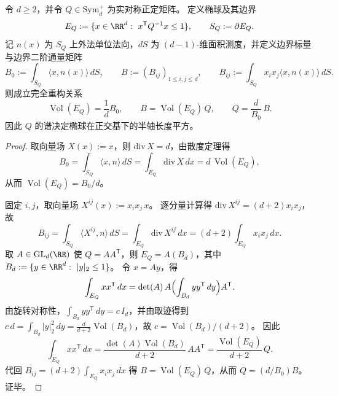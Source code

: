 \begin{theorem}[椭球形状矩阵的边界通量重构]\label{thm:spg-ellipsoid-boundary-flux-reconstruction}
令 \(d\ge 2\)，并令 \(Q\in\mathrm{Sym}_d^{+}\) 为实对称正定矩阵。
定义椭球及其边界
\[
E_Q:=\{x\in\RR^d:\ x^{\mathsf T}Q^{-1}x\le 1\},
\qquad
S_Q:=\partial E_Q.
\]
记 \(n(x)\) 为 \(S_Q\) 上外法单位法向，\(dS\) 为 \((d-1)\)-维面积测度，并定义边界标量与边界二阶通量矩阵
\[
B_0:=\int_{S_Q}\langle x,n(x)\rangle\,dS,
\qquad
B:=(B_{ij})_{1\le i,j\le d},\qquad
B_{ij}:=\int_{S_Q}x_ix_j\langle x,n(x)\rangle\,dS.
\]
则成立完全重构关系
\[
\operatorname{Vol}(E_Q)=\frac{1}{d}B_0,
\qquad
B=\operatorname{Vol}(E_Q)\,Q,
\qquad
Q=\frac{d}{B_0}\,B.
\]
因此 \(Q\) 的谱决定椭球在正交基下的半轴长度平方。
\end{theorem}
\begin{proof}
取向量场 \(X(x):=x\)，则 \(\mathrm{div}\,X=d\)，由散度定理得
\[
B_0=\int_{S_Q}\langle x,n\rangle\,dS=\int_{E_Q}\mathrm{div}\,X\,dx=d\,\operatorname{Vol}(E_Q),
\]
从而 \(\operatorname{Vol}(E_Q)=B_0/d\)。
\par
固定 \(i,j\)，取向量场 \(X^{ij}(x):=x_ix_j\,x\)。
逐分量计算得 \(\mathrm{div}\,X^{ij}=(d+2)x_ix_j\)，故
\[
B_{ij}=\int_{S_Q}\langle X^{ij},n\rangle\,dS=\int_{E_Q}\mathrm{div}\,X^{ij}\,dx
=(d+2)\int_{E_Q}x_ix_j\,dx.
\]
取 \(A\in\mathrm{GL}_d(\RR)\) 使 \(Q=AA^{\mathsf T}\)，则 \(E_Q=A(B_d)\)，其中 \(B_d:=\{y\in\RR^d:\ |y|_2\le 1\}\)。
令 \(x=Ay\)，得
\[
\int_{E_Q}xx^{\mathsf T}\,dx
=\det(A)\,A\Bigl(\int_{B_d}yy^{\mathsf T}\,dy\Bigr)A^{\mathsf T}.
\]
由旋转对称性，\(\int_{B_d}yy^{\mathsf T}\,dy=c\,I_d\)，并由取迹得到
\(
c\,d=\int_{B_d}|y|_2^2\,dy=\frac{d}{d+2}\operatorname{Vol}(B_d)
\)，故 \(c=\operatorname{Vol}(B_d)/(d+2)\)。
因此
\[
\int_{E_Q}xx^{\mathsf T}\,dx
=\frac{\det(A)\operatorname{Vol}(B_d)}{d+2}\,AA^{\mathsf T}
=\frac{\operatorname{Vol}(E_Q)}{d+2}\,Q.
\]
代回 \(B_{ij}=(d+2)\int_{E_Q}x_ix_j\,dx\) 得 \(B=\operatorname{Vol}(E_Q)\,Q\)，从而 \(Q=(d/B_0)B\)。证毕。
\end{proof}



